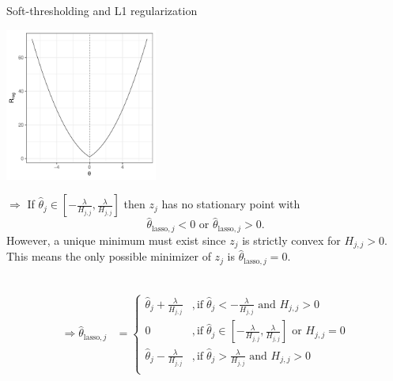 \documentclass[11pt,compress,t,notes=noshow, xcolor=table]{beamer}
\begin{document}
\begin{vbframe}{Soft-thresholding and L1 regularization}
\begin{minipage}{0.49\textwidth}
\end{minipage}
 \newpage


\begin{minipage}{0.4\textwidth}
    \includegraphics[width=5cm]{figure/th_l1_zero.pdf}
\end{minipage}
\hfill
\begin{minipage}{0.49\textwidth}
$\Rightarrow$ If $\hat{\theta}_j \in [-\frac{\lambda}{H_{j,j}}, \frac{\lambda}{H_{j,j}}]$ then $z_j$ has no stationary point with $$\hat{\theta}_{\text{lasso},j} < 0 \text{ or } \hat{\theta}_{\text{lasso},j} > 0.$$ 
However, a unique minimum must exist since $z_j$ is strictly convex for $H_{j,j} > 0$. This means the only possible minimizer of $z_j$ is $\hat{\theta}_{\text{lasso},j} = 0$. %
\\
\end{minipage}
 \\

\begin{align*}\Rightarrow \hat{\theta}_{\text{lasso},j} &= \begin{cases} 
     \hat{\theta}_j + \frac{\lambda}{H_{j,j}} &, \text{if}   \;\hat{\theta}_j < -\frac{\lambda}{H_{j,j}} \text{ and } H_{j,j} > 0\\
       0 &, \text{if}   \;\hat{\theta}_j \in [-\frac{\lambda}{H_{j,j}}, \frac{\lambda}{H_{j,j}}] \text{ or } H_{j,j} = 0\\
     \hat{\theta}_j - \frac{\lambda}{H_{j,j}} &, \text{if}   \;\hat{\theta}_j > \frac{\lambda}{H_{j,j}} \text{ and } H_{j,j} > 0 \\
     \end{cases}
     \end{align*}

\end{vbframe}

\endlecture
\end{document}
